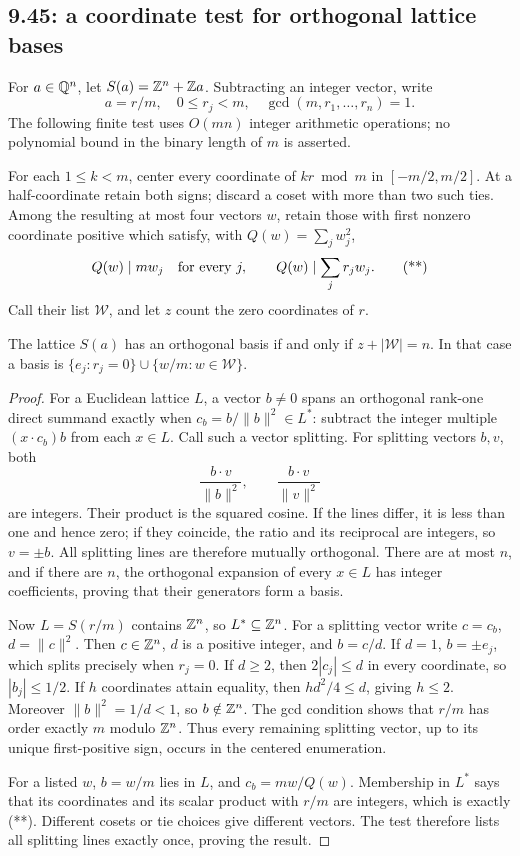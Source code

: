 \subsection{9.45: a coordinate test for orthogonal lattice bases}
\label{cand:9.45}
For \(a\in\mathbb Q^n\), let \(S(a)=\mathbb Z^n+\mathbb Z a\).
Subtracting an integer vector, write
\[
 a=r/m,\quad 0\le r_j<m,\quad \gcd(m,r_1,\ldots,r_n)=1.
\]
The following finite test uses \(O(mn)\) integer arithmetic operations;
no polynomial bound in the binary length of \(m\) is asserted.

For each \(1\le k<m\), center every coordinate of \(kr\bmod m\) in
\([-m/2,m/2]\). At a half-coordinate retain both signs; discard a coset
with more than two such ties. Among the resulting at most four vectors
\(w\), retain those with first nonzero coordinate positive which satisfy,
with \(Q(w)=\sum_jw_j^2\),
\[
 Q(w)\mid mw_j\quad\hbox{for every }j,\qquad
 Q(w)\mid\sum_jr_jw_j.                              \tag{**}
\]
Call their list \(\mathcal W\), and let \(z\) count the zero coordinates
of \(r\).

\begin{proposition}
The lattice \(S(a)\) has an orthogonal basis if and only if
\(z+|\mathcal W|=n\). In that case a basis is
\(\{e_j:r_j=0\}\cup\{w/m:w\in\mathcal W\}\).
\end{proposition}
\begin{proof}
For a Euclidean lattice \(L\), a vector \(b\ne0\) spans an orthogonal
rank-one direct summand exactly when \(c_b=b/\|b\|^2\in L^*\):
subtract the integer multiple \((x\cdot c_b)b\) from each \(x\in L\).
Call such a vector splitting. For splitting vectors \(b,v\), both
\[
 \frac{b\cdot v}{\|b\|^2},\qquad
 \frac{b\cdot v}{\|v\|^2}
\]
are integers. Their product is the squared cosine. If the lines differ,
it is less than one and hence zero; if they coincide, the ratio and its
reciprocal are integers, so \(v=\pm b\). All splitting lines are
therefore mutually orthogonal. There are at most \(n\), and if there are
\(n\), the orthogonal expansion of every \(x\in L\) has integer
coefficients, proving that their generators form a basis.

Now \(L=S(r/m)\) contains \(\mathbb Z^n\), so \(L^*\subseteq\mathbb Z^n\).
For a splitting vector write \(c=c_b\), \(d=\|c\|^2\).
Then \(c\in\mathbb Z^n\), \(d\) is a positive integer, and \(b=c/d\).
If \(d=1\), \(b=\pm e_j\), which splits precisely when \(r_j=0\).
If \(d\ge2\), then \(2|c_j|\le d\) in every coordinate, so
\(|b_j|\le1/2\). If \(h\) coordinates attain equality, then
\(hd^2/4\le d\), giving \(h\le2\).
Moreover \(\|b\|^2=1/d<1\), so \(b\notin\mathbb Z^n\).
The gcd condition shows that \(r/m\) has order exactly \(m\) modulo
\(\mathbb Z^n\). Thus every remaining splitting vector, up to its unique
first-positive sign, occurs in the centered enumeration.

For a listed \(w\), \(b=w/m\) lies in \(L\), and \(c_b=mw/Q(w)\).
Membership in \(L^*\) says that its coordinates and its scalar product
with \(r/m\) are integers, which is exactly (**).
Different cosets or tie choices give different vectors. The test
therefore lists all splitting lines exactly once, proving the result.
\end{proof}

